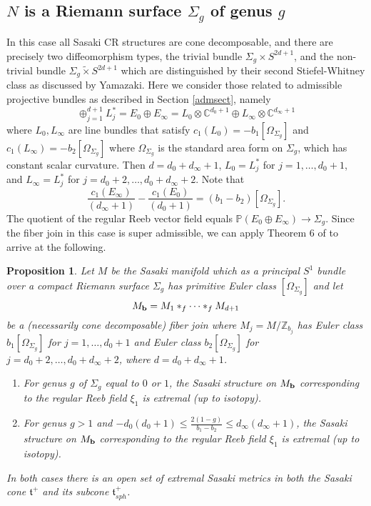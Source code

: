 \documentclass[12pt]{amsart}
\newtheorem{proposition}[theorem]{Proposition}
\def\bbc{{\mathbb C}}
\def\bbp{{\mathbb P}}
\def\bbz{{\mathbb Z}}
\def\grO{\Omega}
\def\grS{\Sigma}
\def\bfb{{\bf b}}
\def\gt{{\mathfrak t}}
\begin{document}
\subsection{$N$ is a Riemann surface $\Sigma_g$ of genus $g$}
In this case all Sasaki CR structures are cone decomposable, and there are precisely two diffeomorphism types, the trivial bundle $\grS_g\times S^{2d+1}$, and the non-trivial bundle $\grS_g\tilde{\times} S^{2d+1}$ which are distinguished by their second Stiefel-Whitney class as discussed by Yamazaki. Here we consider those related to 
admissible projective bundles as described in Section \ref{admsect}, namely 
\begin{equation}\label{vbeq}
\oplus_{j=1}^{d+1}L^*_j=E_0\oplus E_\infty=L_0\otimes \bbc^{d_0+1}\oplus L_\infty\otimes\bbc^{d_\infty+1}
\end{equation}
where $L_0,L_\infty$ are line bundles that satisfy $c_1(L_0)=-b_1 [\Omega_{\Sigma_g}]$ and $c_1(L_\infty)=-b_2[\Omega_{\Sigma_g}]$ where 
$\Omega_{\Sigma_g}$  is the standard area form on $\grS_g$, which has constant scalar curvature. Then $d=d_0+d_\infty+1$, $L_0=L^*_j$ for $j=1,\dots,d_0+1$, and $L_\infty=L^*_j$ for $j=d_0+2,\dots,d_0+d_\infty+2$. Note that 
$$\frac{c_1(E_\infty)}{(d_\infty+1)}-\frac{c_1(E_0)}{(d_0+1)}=(b_1-b_2)[\Omega_{\Sigma_g}].$$
The quotient of the regular Reeb vector field equals 
$\bbp(E_0\oplus E_\infty) \rightarrow \Sigma_g $. Since the fiber join in this case is super admissible, we can apply Theorem 6 of \cite{ACGT08} to arrive at the following.
\begin{proposition}\label{gencoprop}
Let $M$ be the Sasaki manifold which as a principal $S^1$ bundle over a compact Riemann surface $\Sigma_g$ has primitive Euler class $[\grO_{\Sigma_g}]$ and let 
$$M_{\bfb}=M_{1}*_f\cdots*_fM_{d+1}$$ 
be a (necessarily cone decomposable) fiber join where $M_{j}=M/\bbz_{b_j}$ has Euler class $b_1[\grO_{\Sigma_g}]$ for $j=1,\dots,d_0+1$ and Euler class $b_2[\grO_{\Sigma_g}]$ for $j=d_0+2,\dots,d_0+ d_\infty+2$, where $d=d_0+d_\infty+1$. 
\begin{enumerate} 
\item For genus $g$ of $\Sigma_g$ equal to $0$ or $1$, the Sasaki structure on $M_\bfb$  corresponding to  the regular Reeb field $\xi_1$ is extremal 
(up to isotopy). 
\item For genus $g>1$ and $-d_0(d_0+1) \leq \frac{2(1-g)}{b_1-b_2} \leq d_\infty(d_\infty+1)$, the Sasaki structure on $M_\bfb$  corresponding to  the regular Reeb field $\xi_1$ is extremal 
(up to isotopy). 
\end{enumerate}
In both cases there is an open set of extremal Sasaki metrics in both the Sasaki cone $\gt^+$ and its subcone $\gt^+_{sph}$.
\end{proposition}
\end{document}
